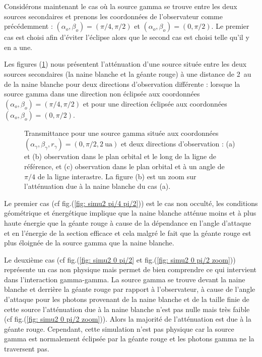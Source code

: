 \documentclass[a4paper,12pt,twoside]{article}
\begin{document}
Considérons maintenant le cas où la source gamma  se trouve entre les deux sources secondaires et prenons les coordonnées de l'observateur comme précédemment : $(\alpha_o, \beta_o) = (\pi/4, \pi/2)$ et $(\alpha_o, \beta_o) = (0, \pi/2)$. Le premier cas est choisi afin d'éviter l'éclipse alors que le second cas est choisi telle qu'il y en a une.

Les figures (\ref{fig: simu2 resultat}) nous présentent l'atténuation d'une source située entre les deux sources secondaires (la naine blanche et la géante rouge) à une distance de \SI{2}{\astronomicalunit} de la naine blanche pour deux directions d'observation différente : lorsque la source gamma dans une direction non éclipsée aux coordonnées $(\alpha_o, \beta_o) = (\pi/4, \pi/2)$ et pour une direction éclipsée aux coordonnées $(\alpha_o, \beta_o) = (0, \pi/2)$.

\begin{figure}[H]
	\centering
    \hfill
    \hfill
    \hfill
    \caption{Transmittance pour une source gamma située aux coordonnées $(\alpha_\gamma, \beta_\gamma, r_\gamma) = (0, \pi/2, \SI{2}{\astronomicalunit})$ et deux directions d'observation :  (a) et (b) observation dans le plan orbital et le long de la ligne de référence, et (c) observation dans le plan orbital et à un angle de $\pi/4$ de la ligne interastre. La figure (b) est un zoom sur l'atténuation due à la naine blanche du cas (a).}
    \label{fig: simu2 resultat}
\end{figure}
Le premier cas (cf fig.(\ref{fig: simu2 pi/4 pi/2})) est le cas non occulté, les conditions géométrique et énergétique implique que la naine blanche atténue moins et à plus haute énergie que la géante rouge à cause de la dépendance en l'angle d'attaque et en l'énergie de la section efficace et cela malgré le fait que la géante rouge est plus éloignée de la source gamma que la naine blanche.

Le deuxième cas (cf fig.(\ref{fig: simu2 0 pi/2} et fig.(\ref{fig: simu2 0 pi/2 zoom})) représente un cas non physique mais permet de bien comprendre ce qui intervient dans l'interaction gamma-gamma. La source gamma se trouve devant la naine blanche et derrière la géante rouge par rapport à l'observateur, à cause de l'angle d'attaque pour les photons provenant de la naine blanche et de la taille finie de cette source l'atténuation due à la naine blanche n'est pas nulle mais très faible (cf fig.(\ref{fig: simu2 0 pi/2 zoom})). Alors la majorité de l'atténuation est due à la géante rouge. Cependant, cette simulation n'est pas physique car la source gamma est normalement éclipsée par la géante rouge et les photons gamma ne la traversent pas.
\end{document}
